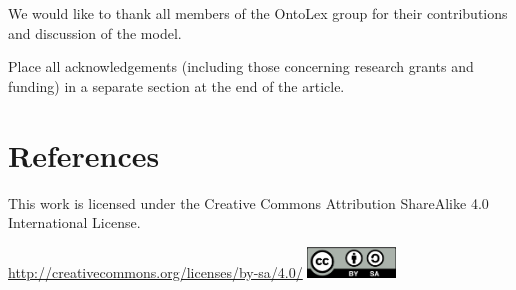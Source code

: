 \documentclass[12pt,a4paper]{elex2017}
\begin{document}
We would like to thank all members of the OntoLex group for their contributions
and discussion of the model.

Place all acknowledgements (including those concerning research grants and
funding) in a separate section at the end of the article.

\section*{References}

\printbibliography[
    type={book},
    notkeyword={dictionary},
    title={Books}
]
\printbibliography[
    type={incollection},
    title={Book Sections}
]
\printbibliography[
    type={inproceedings},
    title={Paper in conference proceedings}
]
\printbibliography[
    type={article},
    title={Journal Articles}
]
\printbibliography[
    type={misc},
    title={Technical Reports}
]
\printbibliography[
    type={book},
    keyword={dictionary},
    title={Dictionaries}
]


\medskip
\begin{minipage}[t]{\textwidth}
    \noindent This work is licensed under the Creative Commons Attribution
    ShareAlike 4.0 International License.
    \vspace{-2ex}
    \begin{center}%
        \url{http://creativecommons.org/licenses/by-sa/4.0/}\linebreak
        \includegraphics[width=2.33cm]{cc.png}%
    \end{center}
\end{minipage}
\end{document}
